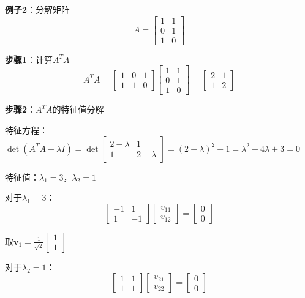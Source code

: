 \documentclass[12pt,a4paper]{article}
\begin{document}
\textbf{例子2}：分解矩阵
\begin{equation}
A = \begin{bmatrix} 1 & 1 \\ 0 & 1 \\ 1 & 0 \end{bmatrix}
\end{equation}

\textbf{步骤1}：计算$A^T A$
\begin{equation}
A^T A = \begin{bmatrix} 1 & 0 & 1 \\ 1 & 1 & 0 \end{bmatrix} \begin{bmatrix} 1 & 1 \\ 0 & 1 \\ 1 & 0 \end{bmatrix} = \begin{bmatrix} 2 & 1 \\ 1 & 2 \end{bmatrix}
\end{equation}

\textbf{步骤2}：$A^T A$的特征值分解

特征方程：$\det(A^T A - \lambda I) = \det\begin{bmatrix} 2-\lambda & 1 \\ 1 & 2-\lambda \end{bmatrix} = (2-\lambda)^2 - 1 = \lambda^2 - 4\lambda + 3 = 0$

特征值：$\lambda_1 = 3$，$\lambda_2 = 1$

对于$\lambda_1 = 3$：
\begin{equation}
\begin{bmatrix} -1 & 1 \\ 1 & -1 \end{bmatrix} \begin{bmatrix} v_{11} \\ v_{12} \end{bmatrix} = \begin{bmatrix} 0 \\ 0 \end{bmatrix}
\end{equation}

取$\bm{v}_1 = \frac{1}{\sqrt{2}} \begin{bmatrix} 1 \\ 1 \end{bmatrix}$

对于$\lambda_2 = 1$：
\begin{equation}
\begin{bmatrix} 1 & 1 \\ 1 & 1 \end{bmatrix} \begin{bmatrix} v_{21} \\ v_{22} \end{bmatrix} = \begin{bmatrix} 0 \\ 0 \end{bmatrix}
\end{equation}
\end{document}
